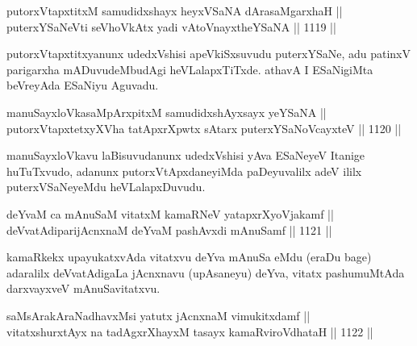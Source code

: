 
\begin{shl}
putorxVtapxtitxM samudidxshayx heyxVSaNA dArasaMgarxhaH || \\
puterxYSaNeVti seVhoVkAtx yadi vA\s toV\s nayxtheYSaNA \hfill || 1119 ||  
\end{shl}

\begin{artha}
putorxVtapxtitxyanunx udedxVshisi apeVkiSxsuvudu puterxYSaNe, adu patinxV parigarxha mADuvudeMbudAgi heVLalapxTiTxde. athavA I ESaNigiMta beVreyAda ESaNiyu Aguvadu.
\end{artha}


\begin{shl}
\footnotemark[1]manuSayxloVkasaMpArxpitxM samudidxshAyxsayx yeYSaNA || \\
putorxVtapxtetxyXVha tatApxrXpwtx sA\s tarx puterxYSaNoVcayxteV \hfill || 1120 ||  
\end{shl}

\begin{artha}
manuSayxloVkavu laBisuvudanunx udedxVshisi yAva ESaNeyeV Itanige huTuTxvudo, adanunx putorxVtApxdaneyiMda paDeyuvalilx adeV ililx puterxVSaNeyeMdu heVLalapxDuvudu.
\end{artha}


\begin{shl}
deYvaM ca mAnuSaM vitatxM kamaRNeV yatapxrXyoVjakamf ||  \\
deVvatAdiparijAcnxnaM deYvaM pashAvxdi mAnuSamf \hfill || 1121 ||  
\end{shl}

\begin{artha}
kamaRkekx upayukatxvAda vitatxvu deYva mAnuSa eMdu (eraDu bage) adaralilx deVvatAdigaLa jAcnxnavu (upAsaneyu) deYva, vitatx pashumuMtAda darxvayxveV mAnuSavitatxvu.
\end{artha}


\begin{shl}
saMsArakAraNadhavxMsi yatutx jAcnxnaM vimukitxdamf || \\
vitatxshurxtAyx na tadAgxrXhayxM tasayx kamaRviroVdhataH \hfill || 1122 ||  
\end{shl}

